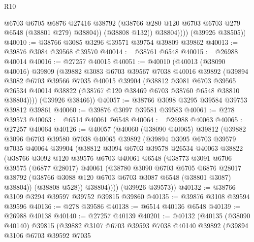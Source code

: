 \begin{lexlean}{R10}
\begin{coremodule}
                  @6703
                  @6705
                  @6876
                  @27416
                  @38792
                  (@38766 @280 @120 @6703 @6703 @279 @6548 (@38801 @279) @38804))
                (@38808 @132))
              @38804))))
      (@39926 @38505))
@40010 := @38766 @3085 @3296 @39571 @39754 @39809 @39862
@40013 := @39876 @3084 @39568 @39570
@40014 := @38761 @6548
@40015 := @26988 @40014
@40016 := @27257 @40015
@40051 := @40010
    (@40013
      (@38090 @40016)
      @39809
      (@39882
        @3083
        @6703
        @39567
        @7038
        @40016
        @39892
        (@39894
          @3082
          @6703
          @39566
          @7035
          @40015
          @39904
          (@38812
            @3081
            @6703
            @39565
            @26534
            @40014
            @38822
            (@38767 @120 @38469 @6703 @38760 @6548 @38810 @38804))))
      (@39926 @38466))
@40057 := @38766 @3098 @3295 @39584 @39753 @39812 @39861
@40060 := @39876 @3097 @39581 @39583
@40061 := @278 @39573
@40063 := @6514 @40061 @6548
@40064 := @26988 @40063
@40065 := @27257 @40064
@40126 := @40057
    (@40060
      (@38090 @40065)
      @39812
      (@39882
        @3096
        @6703
        @39580
        @7038
        @40065
        @39892
        (@39894
          @3095
          @6703
          @39579
          @7035
          @40064
          @39904
          (@38812
            @3094
            @6703
            @39578
            @26534
            @40063
            @38822
            (@38766
              @3092
              @120
              @39576
              @6703
              @40061
              @6548
              (@38773
                @3091
                @6706
                @39575
                (@6877 @28017)
                @40061
                (@38780
                  @3090
                  @6703
                  @6705
                  @6876
                  @28017
                  @38792
                  (@38766 @3088 @120 @6703 @6703 @3087 @6548 (@38801 @3087) @38804))
                (@38808 @528))
              @38804))))
      (@39926 @39573))
@40132 := @38766 @3109 @3294 @39597 @39752 @39815 @39860
@40135 := @39876 @3108 @39594 @39596
@40136 := @278 @39586
@40138 := @6514 @40136 @6548
@40139 := @26988 @40138
@40140 := @27257 @40139
@40201 := @40132
    (@40135
      (@38090 @40140)
      @39815
      (@39882
        @3107
        @6703
        @39593
        @7038
        @40140
        @39892
        (@39894
          @3106
          @6703
          @39592
          @7035

\end{coremodule}
\end{lexlean}

